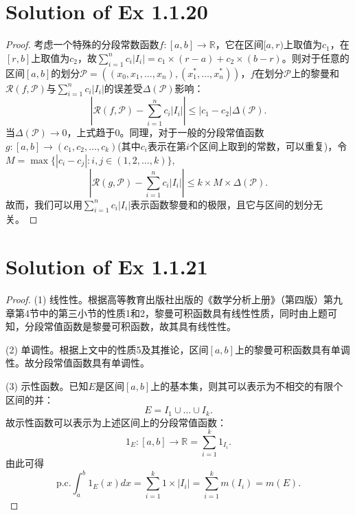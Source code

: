 \documentclass[reqno,a4paper,14pt]{amsart}
\newcommand{\abs}[1]{\left\vert#1\right\vert}
\begin{document}
\section{Solution of Ex 1.1.20}
\begin{proof}
    考虑一个特殊的分段常数函数$f:[a,b]\to \mathbb{R}$，它在区间$[a,r)$上取值为$c_1$，在$[r,b]$上取值为$c_2$，故$\sum_{i=1}^n c_i \abs{I_i}=c_1\times (r-a)+c_2\times (b-r)$。则对于任意的区间$[a,b]$的划分$\mathcal{P}=((x_0,x_1,\dots,x_n),(x^*_1,\dots,x^*_n))$，$f$在划分$\mathcal{P}$上的黎曼和$\mathcal{R}(f,\mathcal{P})$与$\sum_{i=1}^n c_i \abs{I_i}$的误差受$\Delta(\mathcal{P})$影响：
    \begin{equation*}
        \abs{\mathcal{R}(f,\mathcal{P})-\sum_{i=1}^n c_i \abs{I_i}}\leq \abs{c_1-c_2}\Delta(\mathcal{P}).
    \end{equation*}
    当$\Delta(\mathcal{P})\to 0$，上式趋于0。同理，对于一般的分段常值函数$g:[a,b]\to (c_1,c_2,\dots ,c_k)$(其中$c_i$表示在第$i$个区间上取到的常数，可以重复)，令$M=\max\{\abs{c_i-c_j}:i,j\in(1,2,\dots,k)\}$,
    \begin{equation*}
        \abs{\mathcal{R}(g,\mathcal{P})-\sum_{i=1}^n c_i \abs{I_i}}\leq k\times M\times \Delta(\mathcal{P}).
    \end{equation*}
    故而，我们可以用$\sum_{i=1}^n c_i \abs{I_i}$表示函数黎曼和的极限，且它与区间的划分无关。
\end{proof}


\section{Solution of Ex 1.1.21}
\begin{proof}
    (1) 线性性。根据高等教育出版社出版的《数学分析上册》（第四版）第九章第4节中的第三小节的性质1和2，黎曼可积函数具有线性性质，同时由上题可知，分段常值函数是黎曼可积函数，故其具有线性性。

    (2) 单调性。根据上文中的性质5及其推论，区间$[a,b]$上的黎曼可积函数具有单调性。故分段常值函数具有单调性。

    (3) 示性函数。已知$E$是区间$[a,b]$上的基本集，则其可以表示为不相交的有限个区间的并：
    \begin{equation*}
        E=I_1\cup \dots \cup I_k.
    \end{equation*}
    故示性函数可以表示为上述区间上的分段常值函数：
    \begin{equation*}
        1_E:[a,b]\to\mathbb{R}=\sum_{i=1}^k 1_{I_i}.
    \end{equation*}
    由此可得
    \begin{equation*}
        \mathrm{p.c. }\int_a^b 1_E(x)dx=\sum_{i=1}^k 1\times \abs{I_i}=\sum_{i=1}^k m(I_i)=m(E).
    \end{equation*}
\end{proof}
\end{document}
